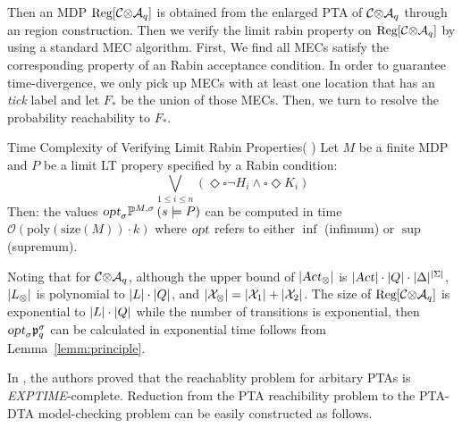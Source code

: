 Then an MDP $\mbox{Reg}[ {{\mathcal{C}}{\otimes}{\mathcal{A}_q}} ]$ is obtained from the enlarged 
PTA of $ {\mathcal{C}}{\otimes}{\mathcal{A}_q} $ through an region construction.
Then we verify the limit rabin property on $\mbox{Reg}[ {{\mathcal{C}}{\otimes}{\mathcal{A}_q}} ]$
by using a standard MEC algorithm. First, We find all MECs satisfy the corresponding
property of an Rabin acceptance condition. In order to guarantee time-divergence,
we only pick up MECs with at least one location that has an \textit{tick} label and 
let $F_*$ be the union of those MECs. Then, we turn to resolve the probability
reachability to $F_*$.
%
\begin{lemma}{Time Complexity of Verifying Limit Rabin Properties(
    \cite[Theorem 10.127]{DBLP:books/daglib/0020348}
)}\label{lemm:principle}
Let $M$ be a finite MDP and $P$ be a limit LT propery specified by a Rabin condition:
$$
\bigvee_{1 \le i \le n} \left(
    \Diamond \square \lnot H_i 
    \land 
    \square \Diamond K_i 
\right)
$$
Then: the values 
$
\mbox{\sl opt}_\sigma \mathbb{P}^{M,\sigma} \left(
    s \models P 
\right)
$ 
can be computed in time \\
$
\mathcal{O} \left( 
    \mbox{poly} \left(
        \mbox{size} \left(
            M
        \right)
    \right)
    \cdot
    k
\right)
$
where $\mbox{\sl opt}$ refers to either $\inf$ (infimum) or $\sup$ (supremum).
\end{lemma}

Noting that for  ${\mathcal{C}}{\otimes}{\mathcal{A}_q}$, 
although the upper bound of $| \mbox{\sl Act}_\otimes |$ is 
$ | \mbox{\sl Act} | \cdot | Q| \cdot | \Delta |^{ | \Sigma | }$, 
$ | L_\otimes | $ is polynomial to $ |L| \cdot |Q| $, and 
$ | \mathcal{X}_\otimes | = | \mathcal{X}_1 | + | \mathcal{X}_2| $.
The size of $ \mbox{Reg}[ {{\mathcal{C}}{\otimes}{\mathcal{A}_q}} ] $ is exponential to 
$ |L| \cdot |Q| $ while the number of transitions is exponential, 
then $\mbox{\sl opt}_\sigma\mathfrak{p}_{q}^{\sigma}$ can be calculated in exponential time 
follows from Lemma~\ref{lemm:principle}.

In \cite{LaroussinieS07}, the authors proved that the reachablity problem for arbitary PTAs is \emph{EXPTIME}-complete. Reduction from the PTA reachibility problem to the PTA-DTA model-checking problem can be easily constructed as follows.


